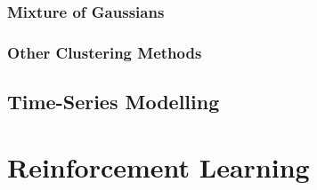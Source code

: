 \documentclass{report}
\begin{document}
\subsection{Mixture of Gaussians}

\subsection{Other Clustering Methods}

\section{Time-Series Modelling}
\label{sec:timeseries}



\chapter{Reinforcement Learning}










\end{document}
